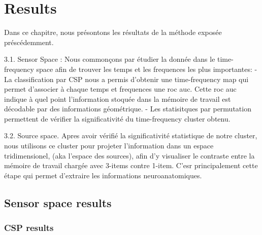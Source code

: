 \chapter{Results}

Dans ce chapitre, nous présontons les résultats de la méthode exposée préscédemment. 

3.1. Sensor Space : Nous commonçons par étudier la donnée dans le time-frequency space afin de trouver les temps et les frequences les plus importantes:
- La classification par CSP nous a permis d'obtenir une time-frequency map qui permet d'associer à chaque temps et frequences une roc auc. Cette roc auc indique à quel point l'information stoquée dans la mémoire de travail est décodable par des informations géométrique.
- Les statisitques par permutation permettent de vérifier la significativité du time-frequency cluster obtenu.

3.2. Source space. Apres avoir vérifié la significativité statistique de notre cluster, nous utilisons ce cluster pour projeter l'information dans un espace tridimensionel, (aka l'espace des sources), afin d'y visualiser le contraste entre la mémoire de travail chargée avec 3-items contre 1-item. C'esr principalement cette étape qui permet d'extraire les informations neuroanatomiques.

\section{Sensor space results}

\subsection{CSP results}


